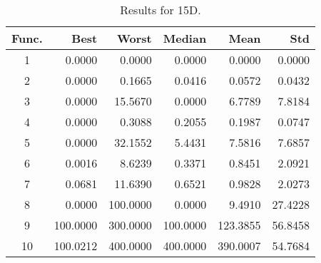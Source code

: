 \begin{table}[ht]
\centering
\caption{ Results for 15D. }
\label{tab:15D}
\begin{tabular}{crrrrr}
\hline
{Func.} & Best & Worst & Median & Mean & Std \\
\hline
1 & 0.0000 & 0.0000 & 0.0000 & 0.0000 & 0.0000 \\
2 & 0.0000 & 0.1665 & 0.0416 & 0.0572 & 0.0432 \\
3 & 0.0000 & 15.5670 & 0.0000 & 6.7789 & 7.8184 \\
4 & 0.0000 & 0.3088 & 0.2055 & 0.1987 & 0.0747 \\
5 & 0.0000 & 32.1552 & 5.4431 & 7.5816 & 7.6857 \\
6 & 0.0016 & 8.6239 & 0.3371 & 0.8451 & 2.0921 \\
7 & 0.0681 & 11.6390 & 0.6521 & 0.9828 & 2.0273 \\
8 & 0.0000 & 100.0000 & 0.0000 & 9.4910 & 27.4228 \\
9 & 100.0000 & 300.0000 & 100.0000 & 123.3855 & 56.8458 \\
10 & 100.0212 & 400.0000 & 400.0000 & 390.0007 & 54.7684 \\
\hline
\end{tabular}
\end{table}

